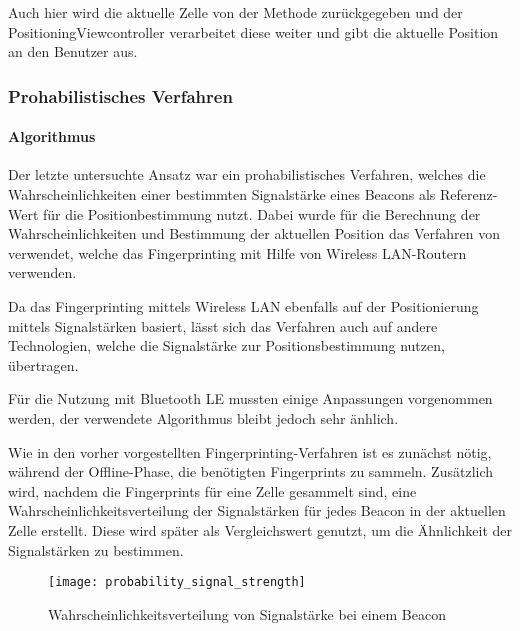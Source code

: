 Auch hier wird die aktuelle Zelle von der Methode zurückgegeben und der PositioningViewcontroller verarbeitet diese weiter und gibt die aktuelle Position an den Benutzer aus.

\subsubsection{Prohabilistisches Verfahren}
\label{sec:implementation:fingerprinting:positioning:probability}

\paragraph{Algorithmus}
\label{sec:implementation:fingerprinting:positioning:probability:algorithm}

Der letzte untersuchte Ansatz war ein prohabilistisches Verfahren, welches die Wahrscheinlichkeiten einer bestimmten Signalstärke eines Beacons als Referenz-Wert für die Positionbestimmung nutzt. Dabei wurde für die Berechnung der Wahrscheinlichkeiten und Bestimmung der aktuellen Position das Verfahren von \citet{wifiFingerprintProbability} verwendet, welche das Fingerprinting mit Hilfe von Wireless LAN-Routern verwenden.

Da das Fingerprinting mittels Wireless LAN ebenfalls auf der Positionierung mittels Signalstärken basiert, lässt sich das Verfahren auch auf andere Technologien, welche die Signalstärke zur Positionsbestimmung nutzen, übertragen.

Für die Nutzung mit Bluetooth LE mussten einige Anpassungen vorgenommen werden, der verwendete Algorithmus bleibt jedoch sehr änhlich.

Wie in den vorher vorgestellten Fingerprinting-Verfahren ist es zunächst nötig, während der Offline-Phase, die benötigten Fingerprints zu sammeln.
Zusätzlich wird, nachdem die Fingerprints für eine Zelle gesammelt sind, eine Wahrscheinlichkeitsverteilung der Signalstärken für jedes Beacon in der aktuellen Zelle erstellt. Diese wird später als Vergleichswert genutzt, um die Ähnlichkeit der Signalstärken zu bestimmen.

\begin{figure}[htb!]
		\centering
	\texttt{[image: probability\_signal\_strength]}
	\caption{Wahrscheinlichkeitsverteilung von Signalstärke bei einem Beacon}
	\label{probability-signal-strength-beacon}
\end{figure}

